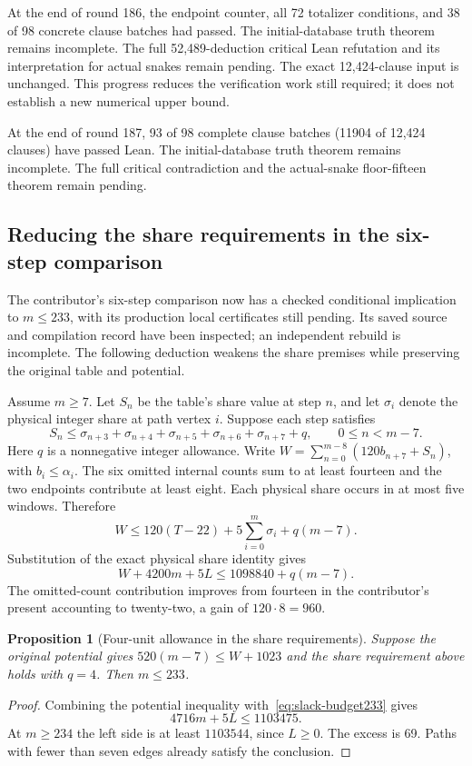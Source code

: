 \documentclass[11pt,a4paper]{article}
\newtheorem{proposition}[theorem]{Proposition}
\theoremstyle{definition}
\theoremstyle{remark}
\begin{document}
At the end of round 186, the endpoint counter, all 72 totalizer conditions, and 38 of 98 concrete clause batches had passed. The initial-database truth theorem remains incomplete.
The full 52,489-deduction critical Lean refutation and its interpretation
for actual snakes remain pending. The exact 12,424-clause input is
unchanged. This progress reduces the verification work still required;
it does not establish a new numerical upper bound.

At the end of round 187, 93 of 98 complete clause batches (11904 of 12,424 clauses) have passed Lean. The initial-database truth theorem remains incomplete. The full critical contradiction and the actual-snake floor-fifteen theorem remain pending.

\subsection{Reducing the share requirements in the six-step comparison}\label{sec:slack233}
The contributor's six-step comparison now has a checked conditional
implication to $m\le233$, with its production local certificates still
pending. Its saved source and compilation record have been inspected;
an independent rebuild is incomplete. The following deduction weakens
the share premises while preserving the original table and potential.

Assume $m\ge7$. Let $S_n$ be the table's share value at step $n$,
and let $\sigma_i$ denote the physical integer share at path vertex $i$.
Suppose each step satisfies
\[
S_n\le\sigma_{n+3}+\sigma_{n+4}+\sigma_{n+5}
       +\sigma_{n+6}+\sigma_{n+7}+q,
\qquad 0\le n<m-7.
\]
Here $q$ is a nonnegative integer allowance. Write
$W=\sum_{n=0}^{m-8}(120b_{n+7}+S_n)$, with $b_i\le\alpha_i$.
The six omitted internal counts sum to at least fourteen and the two
endpoints contribute at least eight. Each physical share occurs in at
most five windows. Therefore
\[
W\le120(T-22)+5\sum_{i=0}^{m}\sigma_i+q(m-7).
\]
Substitution of the exact physical share identity gives
\begin{equation}\label{eq:slack-budget233}
W+4200m+5L\le1098840+q(m-7).
\end{equation}
The omitted-count contribution improves from fourteen in the contributor's
present accounting to twenty-two, a gain of $120\cdot8=960$.

\begin{proposition}[Four-unit allowance in the share requirements]
Suppose the original potential gives $520(m-7)\le W+1023$ and the
share requirement above holds with $q=4$. Then $m\le233$.
\end{proposition}
\begin{proof}
Combining the potential inequality with~\eqref{eq:slack-budget233} gives
\[
4716m+5L\le1103475.
\]
At $m\ge234$ the left side is at least $1103544$, since $L\ge0$.
The excess is 69. Paths with fewer than seven edges already satisfy
the conclusion.
\end{proof}
\end{document}
